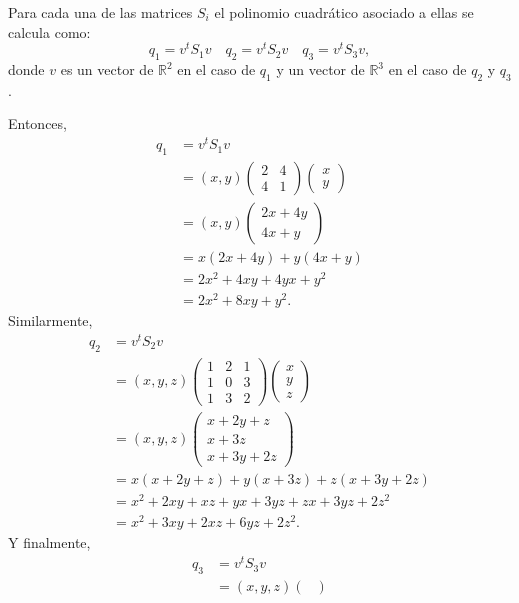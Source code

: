 \documentclass[twocolumn]{notasdeclase}
\newcommand{\R}{\mathbb{R}}
\begin{document}
\begin{sol}
	Para cada una de las matrices $S_i$ el polinomio cuadrático asociado a ellas se calcula como:
	\[ q_1 = v^tS_1v\quad q_2=v^tS_2v\quad q_3=v^tS_3v, \]
	donde $v$ es un vector de $\R^2$ en el caso de $q_1$ y un vector de $\R^3$ en el caso de $q_2$ y $q_3$.
	
	Entonces,
	\begin{align*}
		q_1 &=  v^tS_1v \\
			&= (x,y) \begin{pmatrix}
			2 & 4 \\ 4 & 1
			\end{pmatrix} \begin{pmatrix}
			x \\ y
			\end{pmatrix} \\
			&= (x,y) \begin{pmatrix}
			2x+4y \\
			4x+y
			\end{pmatrix} \\
			&= x(2x+4y) + y(4x+y)\\
			&= 2x^2+4xy+4yx+y^2 \\
			&= 2x^2+8xy+y^2.
	\end{align*}
	Similarmente,
	\begin{align*}
		q_2 &= v^tS_2v \\
			&= (x,y,z) \begin{pmatrix}
			1 & 2 &1 \\
			1 & 0 & 3 \\
			1 & 3 & 2
			\end{pmatrix} \begin{pmatrix}
			x \\ y \\ z
			\end{pmatrix} \\
			&= (x,y,z)\begin{pmatrix}
			x+2y+z \\
			x+3z \\
			x+3y+2z
			\end{pmatrix} \\
			&=x(x+2y+z) + y(x+3z) + z(x+3y+2z) \\
			&=x^2+2xy+xz+yx+3yz+zx+3yz+2z^2 \\
			&=x^2+3xy+2xz+6yz+2z^2.
	\end{align*}
	Y finalmente,
	\begin{align*}
		q_3 &= v^tS_3v \\
			&= (x,y,z)\begin{pmatrix}

\end{pmatrix}
\end{align*}
\end{sol}
\end{document}
